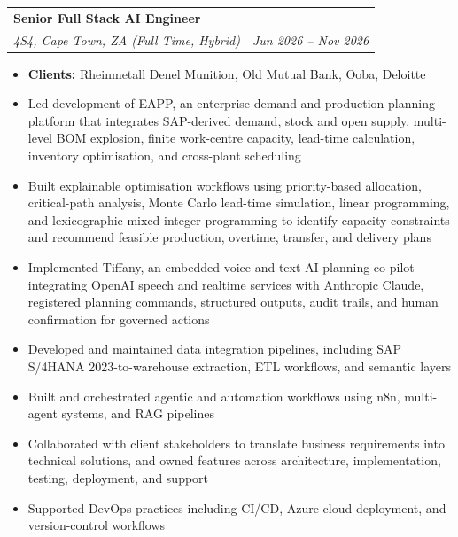 \documentclass[letterpaper,11pt]{article}
\makeatletter
\newcommand{\resumeItem}[1]{
  \item\small{
    {#1 \vspace{-1pt}}
  }
}
\newcommand{\resumeSubheading}[4]{
  \vspace{-2pt}\item
    \begin{tabular*}{1.0\textwidth}[t]{l@{\extracolsep{\fill}}r}
      \textbf{\large#1} & \textbf{\small #2} \\
      \textit{\large#3} & \textit{\small #4} \\

    \end{tabular*}\vspace{-7pt}
}
\newcommand{\resumeItemListStart}{\begin{itemize}[leftmargin=0.1in]}
\newcommand{\resumeItemListEnd}{\end{itemize}\vspace{-5pt}}
\makeatother
\begin{document}
    \resumeSubheading
      {Senior Full Stack AI Engineer}{}
      {4S4, Cape Town, ZA (Full Time, Hybrid)}{Jun 2026 -- Nov 2026}
      \resumeItemListStart
            \resumeItem{\normalsize{\textbf{Clients:} Rheinmetall Denel Munition, Old Mutual Bank, Ooba, Deloitte}}
            \resumeItem{\normalsize{Led development of EAPP, an enterprise demand and production-planning platform that integrates SAP-derived demand, stock and open supply, multi-level BOM explosion, finite work-centre capacity, lead-time calculation, inventory optimisation, and cross-plant scheduling}}
            \resumeItem{\normalsize{Built explainable optimisation workflows using priority-based allocation, critical-path analysis, Monte Carlo lead-time simulation, linear programming, and lexicographic mixed-integer programming to identify capacity constraints and recommend feasible production, overtime, transfer, and delivery plans}}
            \resumeItem{\normalsize{Implemented Tiffany, an embedded voice and text AI planning co-pilot integrating OpenAI speech and realtime services with Anthropic Claude, registered planning commands, structured outputs, audit trails, and human confirmation for governed actions}}
            \resumeItem{\normalsize{Developed and maintained data integration pipelines, including SAP S/4HANA 2023-to-warehouse extraction, ETL workflows, and semantic layers}}
            \resumeItem{\normalsize{Built and orchestrated agentic and automation workflows using n8n, multi-agent systems, and RAG pipelines}}
            \resumeItem{\normalsize{Collaborated with client stakeholders to translate business requirements into technical solutions, and owned features across architecture, implementation, testing, deployment, and support}}
            \resumeItem{\normalsize{Supported DevOps practices including CI/CD, Azure cloud deployment, and version-control workflows}}
      \resumeItemListEnd
      \vspace{7pt}
\end{document}
